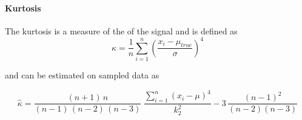 \paragraph{Kurtosis}
The kurtosis is a measure of the  of the signal and is defined as
\begin{equation}
    \kappa = \frac{1}{n}\sum_{i=1}^n \left(\frac{x_i - \mu_{true}}{\sigma}\right)^4
\end{equation}

and can be estimated on sampled data as

\begin{equation}
  \hat{\kappa} = \frac{(n+1)\,n}{(n-1)\,(n-2)\,(n-3)} \; \frac{\sum_{i=1}^n (x_i - \mu)^4}{k_2^2} - 3\,\frac{(n-1)^2}{(n-2) (n-3)}
\end{equation}